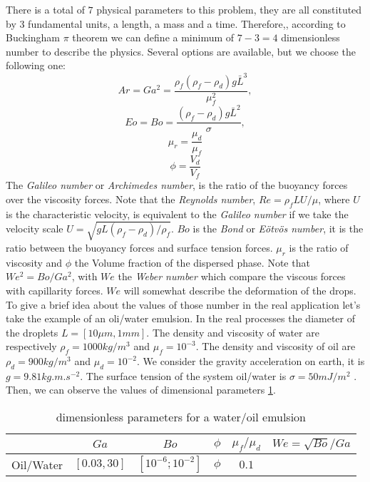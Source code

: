 There is a total of $7$ physical parameters to this problem, they are all constituted by 3 fundamental units, a length, a mass and a time.
Therefore,, according to Buckingham $\pi$ theorem we can define a minimum of $7-3 = 4$ dimensionless number to describe the physics. 
Several options are available, but we choose the following one: 
\begin{equation*}
    Ar = Ga^2 =\frac{\rho_f(\rho_f - \rho_d) g \bar{L}^3}{\mu^2_f},
\end{equation*}
\begin{equation*}
    Eo = Bo =\frac{(\rho_f - \rho_d) g \bar{L}^2}{\sigma},
\end{equation*}
\begin{equation*}
    \mu_r = \frac{\mu_d}{\mu_f}
\end{equation*}
\begin{equation*}
    \phi = \frac{V_d}{V_f}
\end{equation*}
The \textit{Galileo number} or \textit{Archimedes number}, is the ratio of the buoyancy forces over the viscosity forces.
Note that the \textit{Reynolds number}, $Re = \rho_f L U/\mu$, where $U$ is the characteristic velocity, is equivalent to the \textit{Galileo number} if we take the velocity scale $U = \sqrt{gL(\rho_f-\rho_d)/\rho_f}$.
$Bo$ is the \textit{Bond} or \textit{Eötvös number}, it is the ratio between the buoyancy forces and surface tension forces. 
$\mu_r$ is the ratio of viscosity and $\phi$ the Volume fraction of the dispersed phase.
Note that $We^2 = Bo/Ga^2$, with $We$ the \textit{Weber number} which compare the viscous forces with capillarity forces.
$We$ will somewhat describe the deformation of the drops. 
To give a brief idea about the values of those number in the real application let's take the example of an oli/water emulsion.
In the real processes the diameter of the droplets $L = [10 \mu m, 1 mm]$.
The density and viscosity of water are respectively $\rho_f = 1000 kg/m^3$ and $\mu_f = 10^{-3}$.
The density and viscosity of oil are $\rho_d = 900 kg/m^3$ and $\mu_d = 10^{-2}$.
We consider the gravity acceleration on earth, it is $g= 9.81 kg.m.s^{-2}$.
The surface tension of the system oil/water is $\sigma = 50 mJ/m^2$ \citep{de2015gouttes}. 
Then, we can observe the values of dimensional parameters \ref{tab:parameters}.
\begin{table}[h!]
    \centering
    \begin{tabular}{|c||c|c|c|c||||c|}
        \hline&$Ga$&$Bo$&$\phi$&$\mu_f/\mu_d$&$We=\sqrt{Bo}/Ga$\\ \hline
        \hline Oil/Water&$[0.03,30]$&$[10^{-6};10^{-2}]$&$\phi$&$0.1$&$ $\\ \hline
    \end{tabular}
    \caption{dimensionless parameters for a water/oil emulsion}
    \label{tab:parameters}
\end{table}



